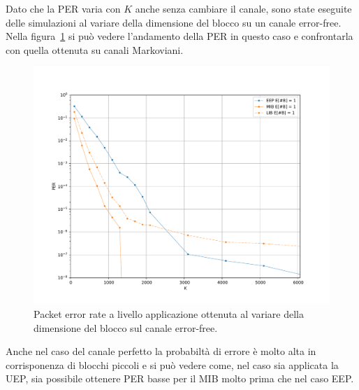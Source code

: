 \documentclass[italian, a4paper, 12pt]{article}
\begin{document}
Dato che la PER varia con $K$ anche senza cambiare il canale, sono
state eseguite delle simulazioni al variare della dimensione del
blocco su un canale error-free. Nella figura~\ref{fig:markov_zero} si
può vedere l'andamento della PER in questo caso e confrontarla con
quella ottenuta su canali Markoviani.
%
\begin{figure}[H]
  \centering
  \includegraphics[width=\textwidth]{plot_markov_zero}
  \caption{Packet error rate a livello applicazione ottenuta al
    variare della dimensione del blocco sul canale error-free.}
  \label{fig:markov_zero}
\end{figure}
%
Anche nel caso del canale perfetto la probabiltà di errore è molto
alta in corrisponenza di blocchi piccoli e si può vedere come, nel
caso sia applicata la UEP, sia possibile ottenere PER basse per il MIB
molto prima che nel caso EEP.
\end{document}
